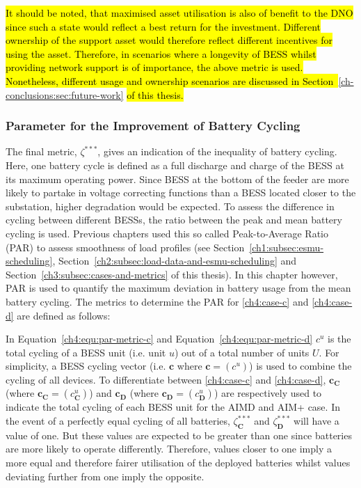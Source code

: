 \hl{It should be noted, that maximised asset utilisation is also of benefit to the DNO since such a state would reflect a best return for the investment.
Different ownership of the support asset would therefore reflect different incentives for using the asset.
Therefore, in scenarios where a longevity of BESS whilst providing network support is of importance, the above metric is used.
Nonetheless, different usage and ownership scenarios are discussed in Section~}\ref{ch-conclusions:sec:future-work}\hl{ of this thesis.}

\subsubsection{Parameter for the Improvement of Battery Cycling}

The final metric, $\zeta^{***}$, gives an indication of the inequality of battery cycling.
Here, one battery cycle is defined as a full discharge and charge of the BESS at its maximum operating power.
Since BESS at the bottom of the feeder are more likely to partake in voltage correcting functions than a BESS located closer to the substation, higher degradation would be expected.
To assess the difference in cycling between different BESSs, the ratio between the peak and mean battery cycling is used.
Previous chapters used this so called Peak-to-Average Ratio (PAR) to assess smoothness of load profiles (see Section~\ref{ch1:subsec:esmu-scheduling}, Section~\ref{ch2:subsec:load-data-and-esmu-scheduling} and Section~\ref{ch3:subsec:cases-and-metrics} of this thesis).
In this chapter however, PAR is used to quantify the maximum deviation in battery usage from the mean battery cycling.
The metrics to determine the PAR for \ref{ch4:case-c} and \ref{ch4:case-d} are defined as follows:




In Equation~\ref{ch4:equ:par-metric-c} and Equation~\ref{ch4:equ:par-metric-d} $c^u$ is the total cycling of a BESS unit (i.e. unit $u$) out of a total number of units $U$.
For simplicity, a BESS cycling vector (i.e. $\textbf{c}$ where $\textbf{c} = (c^u)$) is used to combine the cycling of all devices.
To differentiate between \ref{ch4:case-c} and \ref{ch4:case-d}, $\textbf{c}_\textbf{C}$ (where $\textbf{c}_\textbf{C} = (c^u_\textbf{C})$) and $\textbf{c}_\textbf{D}$ (where $\textbf{c}_\textbf{D} = (c^u_\textbf{D})$) are respectively used to indicate the total cycling of each BESS unit for the AIMD and AIM+ case.
In the event of a perfectly equal cycling of all batteries, $\zeta^{***}_\textbf{C}$ and $\zeta^{***}_\textbf{D}$ will have a value of one.
But these values are expected to be greater than one since batteries are more likely to operate differently.
Therefore, values closer to one imply a more equal and therefore fairer utilisation of the deployed batteries whilst values deviating further from one imply the opposite.
